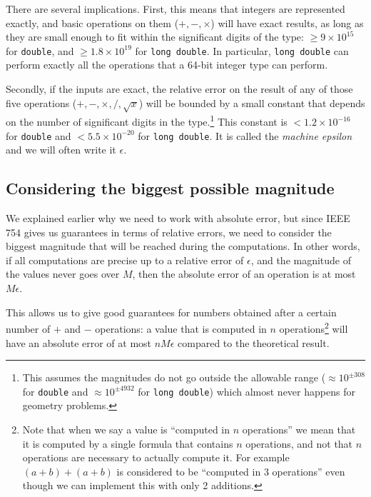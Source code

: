 There are several implications. First, this means that integers are represented exactly, and basic operations on them ($+,-,\times$) will have exact results, as long as they are small enough to fit within the significant digits of the type: $\geq 9\times 10^{15}$ for \lstinline|double|, and $\geq 1.8 \times 10^{19}$ for \lstinline|long double|. In particular, \lstinline|long double| can perform exactly all the operations that a 64-bit integer type can perform.

Secondly, if the inputs are exact, the relative error on the result of any of those five operations ($+,-,\times,/,\sqrt{x}$) will be bounded by a small constant that depends on the number of significant digits in the type.\footnote{This assumes the magnitudes do not go outside the allowable range ($\approx 10^{\pm 308}$ for \lstinline|double| and $\approx 10^{\pm 4932}$ for \lstinline|long double|) which almost never happens for geometry problems.} This constant is $< 1.2 \times 10^{-16}$ for \lstinline|double| and $< 5.5 \times 10^{-20}$ for \lstinline|long double|. It is called the \emph{machine epsilon} and we will often write it $\epsilon$.

\subsection{Considering the biggest possible magnitude}\label{ss:biggest-mag}
We explained earlier why we need to work with absolute error, but since IEEE 754 gives us guarantees in terms of relative errors, we need to consider the biggest magnitude that will be reached during the computations. In other words, if all computations are precise up to a relative error of $\epsilon$, and the magnitude of the values never goes over $M$, then the absolute error of an operation is at most $M\epsilon$.

This allows us to give good guarantees for numbers obtained after a certain number of $+$ and $-$ operations: a value that is computed in $n$ operations\footnote{Note that when we say a value is ``computed in $n$ operations'' we mean that it is computed by a single formula that contains $n$ operations, and not that $n$ operations are necessary to actually compute it. For example $(a+b)+(a+b)$ is considered to be ``computed in 3 operations'' even though we can implement this with only 2 additions.} will have an absolute error of at most $nM\epsilon$ compared to the theoretical result.

